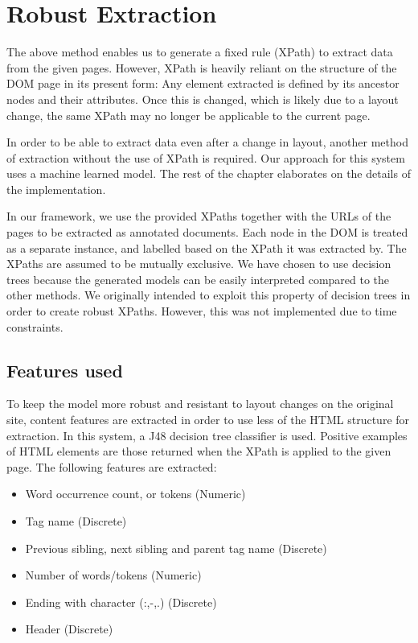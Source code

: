 \section{Robust Extraction}
\label{section:extraction}
The above method enables us to generate a fixed rule (XPath) to extract data from the given pages. However, XPath is heavily reliant on the structure of the DOM page in its present form: Any element extracted is defined by its ancestor nodes and their attributes. Once this is changed, which is likely due to a layout change, the same XPath may no longer be applicable to the current page. 

In order to be able to extract data even after a change in layout, another method of extraction without the use of XPath is required. Our approach for this system uses a machine learned model. The rest of the chapter elaborates on the details of the implementation.

In our framework, we use the provided XPaths together with the URLs of the pages to be extracted as annotated documents. Each node in the DOM is treated as a separate instance, and labelled based on the XPath it was extracted by. The XPaths are assumed to be mutually exclusive. We have chosen to use decision trees because the generated models can be easily interpreted compared to the other methods. We originally intended to exploit this property of decision trees in order to create robust XPaths. However, this was not implemented due to time constraints.

\subsection{Features used}
To keep the model more robust and resistant to layout changes on the original site, content features are extracted in order to use less of the HTML structure for extraction. In this system, a J48 decision tree classifier is used. Positive examples of HTML elements are those returned when the XPath is applied to the given page. The following features are extracted:

	\begin{itemize}
		\item Word occurrence count, or tokens (Numeric)
		\item Tag name (Discrete)
		\item Previous sibling, next sibling and parent tag name (Discrete)
		\item Number of words/tokens (Numeric)
		\item Ending with character (:,-,.) (Discrete)
		\item Header (Discrete)
	\end{itemize}
	

